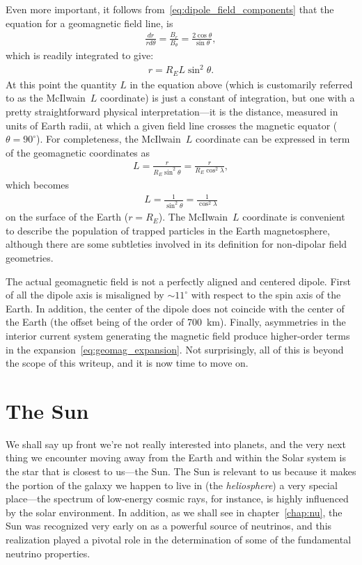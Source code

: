 Even more important, it follows from~\eqref{eq:dipole_field_components} that
the equation for a geomagnetic field line, is
\begin{align}
  \frac{dr}{rd\theta} = \frac{B_r}{B_\theta} = \frac{2\cos\theta}{\sin\theta},
\end{align}
which is readily integrated to give:
\begin{align}
  r = R_EL\sin^2\theta.
\end{align}
At this point the quantity $L$ in the equation above (which is customarily referred
to as the McIlwain~$L$ coordinate) is just a constant of integration, but one with
a pretty straightforward physical interpretation---it is the distance, measured
in units of Earth radii, at which a given field line crosses the magnetic equator
($\theta = 90^\circ$). For completeness, the McIlwain~$L$ coordinate can be expressed
in term of the geomagnetic coordinates as
\begin{align}
  L = \frac{r}{R_E \sin^2\theta} = \frac{r}{R_E \cos^2\lambda},
\end{align}
which becomes
\begin{align}
  L = \frac{1}{\sin^2\theta} = \frac{1}{\cos^2\lambda}
\end{align}
on the surface of the Earth ($r = R_E$). The McIlwain~$L$ coordinate is convenient
to describe the population of trapped particles in the Earth magnetosphere, although
there are some subtleties involved in its definition for non-dipolar field geometries.

The actual geomagnetic field is not a perfectly aligned and centered dipole.
First of all the dipole axis is misaligned by $\sim 11^\circ$ with respect to
the spin axis of the Earth. In addition, the center of the dipole does not
coincide with the center of the Earth (the offset being of the order of 700~km).
Finally, asymmetries in the interior current system generating the magnetic
field produce higher-order terms in the expansion~\eqref{eq:geomag_expansion}.
Not surprisingly, all of this is beyond the scope of this writeup, and it is now
time to move on.



\section{The Sun}
\label{sec:sun}

We shall say up front we're not really interested into planets, and the very next
thing we encounter moving away from the Earth and within the Solar system is the
star that is closest to us---the Sun. The Sun is relevant to us because it makes
the portion of the galaxy we happen to live in (the \emph{heliosphere}) a very special
place---the spectrum of low-energy cosmic rays, for instance, is highly influenced
by the solar environment. In addition, as we shall see in chapter~\ref{chap:nu},
the Sun was recognized very early on as a powerful source of neutrinos, and this
realization played a pivotal role in the determination of some of the fundamental
neutrino properties.

